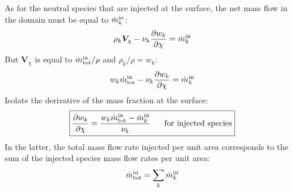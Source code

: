 \documentclass{warpdoc}
\newcommand\frameeqn[1]{\fbox{$\displaystyle #1$}}
\renewcommand{\vec}[1]{\bm{#1}}
\begin{document}
As for the neutral species that are injected at the surface, the net mass flow in the domain must be equal to $\dot{m}^{\rm in}_k$:
%
\begin{equation}
  \rho_k \vec{V}_\chi - \nu_k \frac{\partial w_k}{\partial \chi} =\dot{m}^{\rm in}_k
\end{equation}
%
But $\vec{V}_\chi$ is equal to $\dot{m}^{\rm in}_{\rm tot}/\rho$ and $\rho_k/\rho=w_k$:
%
\begin{equation}
  w_k \dot{m}^{\rm in}_{\rm tot} - \nu_k \frac{\partial w_k}{\partial \chi} =\dot{m}^{\rm in}_k
\end{equation}
%
Isolate the derivative of the mass fraction at the surface:
%
\begin{equation}
\frameeqn{
\frac{\partial w_k}{\partial \chi}=  \frac{w_k \dot{m}^{\rm in}_{\rm tot} - \dot{m}^{\rm in}_k}{ \nu_k }
~~~~~\textrm{for~injected~species}
}
\end{equation}
%
In the latter, the total mass flow rate injected per unit area corresponds to the sum of the injected species mass flow rates per unit area:
%
\begin{equation}
  \dot{m}^{\rm in}_{\rm tot} = \sum_k \dot{m}^{\rm in}_k
\end{equation}
%



  
  


%             
\end{document}
